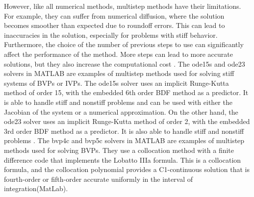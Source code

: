 However, like all numerical methods, multistep methods have their limitations. For example, they can suffer from numerical diffusion, where the solution becomes smoother than expected due to roundoff errors. This can lead to inaccuracies in the solution, especially for problems with stiff behavior. Furthermore, the choice of the number of previous steps to use can significantly affect the performance of the method. More steps can lead to more accurate solutions, but they also increase the computational cost \cite{math7121158}.
The ode15s and ode23 solvers in MATLAB are examples of multistep methods used for solving stiff systems of BVPs or IVPs. The ode15s solver uses an implicit Runge-Kutta method of order 15, with the embedded 6th order BDF method as a predictor. It is able to handle stiff and nonstiff problems and can be used with either the Jacobian of the system or a numerical approximation. On the other hand, the ode23 solver uses an implicit Runge-Kutta method of order 2, with the embedded 3rd order BDF method as a predictor. It is also able to handle stiff and nonstiff problems \cite{wong2020lecture}.
The bvp4c and bvp5c solvers in MATLAB are examples of multistep methods used for solving BVPs. They use a collocation method with a finite difference code that implements the Lobatto IIIa formula. This is a collocation formula, and the collocation polynomial provides a C1-continuous solution that is fourth-order or fifth-order accurate uniformly in the interval of integration(MatLab).